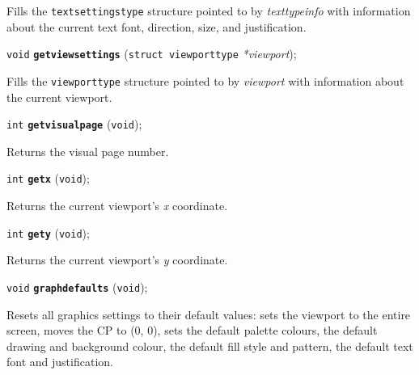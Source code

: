\documentclass[a4paper,12pt]{article}
\newcommand{\V}{\texttt{void}}      %
\newcommand{\I}{\texttt{int}}       %
\newcommand{\func}[1]{\textbf{\texttt{#1}}}  %
\newcommand{\A}[1]{\emph{#1}}       %
\newenvironment{bgi}
{ %
  \begin{snugshade}
}
{ %
  \end{snugshade}
}
\begin{document}
Fills the \texttt{textsettingstype} structure pointed to by
\A{texttypeinfo} with information about the current text font,
direction, size, and justification.


\label{sec:getviewsettings}

\begin{bgi}
\V{} \func{getviewsettings} (\texttt{struct viewporttype} \A{*viewport});
\end{bgi}

Fills the \texttt{viewporttype} structure pointed to by \A{viewport}
with information about the current viewport.


\label{sec:getvisualpage}

\begin{bgi}
\I{} \func{getvisualpage} (\V{});
\end{bgi}

Returns the visual page number.


\label{sec:getx}

\begin{bgi}
\I{} \func{getx} (\V{});
\end{bgi}

Returns the current viewport's \A{x} coordinate.


\label{sec:gety}

\begin{bgi}
\I{} \func{gety} (\V{});
\end{bgi}

Returns the current viewport's \A{y} coordinate.


\label{sec:graphdefaults}

\begin{bgi}
\V{} \func{graphdefaults} (\V{});
\end{bgi}

Resets all graphics settings to their default values: sets the
viewport to the entire screen, moves the CP to (0, 0), sets the
default palette colours, the default drawing and background colour,
the default fill style and pattern, the default text font and
justification.
\end{document}
